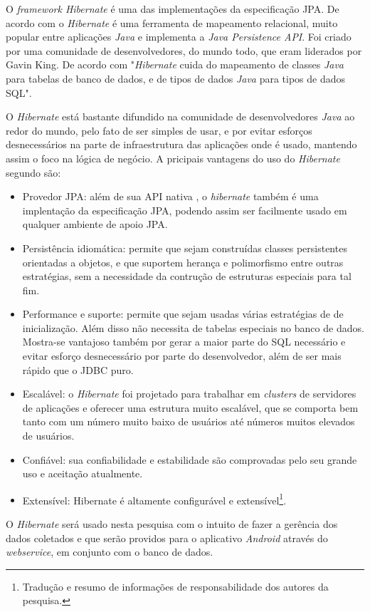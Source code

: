 	\par O \textit{framework Hibernate} é uma das implementações da especificação
JPA. De acordo com  o \textit{Hibernate} é
uma ferramenta de mapeamento relacional, muito popular entre aplicações
\textit{Java} e implementa a \textit{Java Persistence API}. Foi criado por uma
comunidade de desenvolvedores, do mundo todo, que eram liderados por Gavin King.
De acordo com  "\textit{Hibernate} cuida do mapeamento
de classes \textit{Java} para tabelas de banco de dados, e de tipos de dados
\textit{Java} para tipos de dados SQL".

	\par O \textit{Hibernate} está bastante difundido na comunidade de
desenvolvedores \textit{Java} ao redor do mundo, pelo fato de ser simples de
usar, e por evitar esforços desnecessários na parte de infraestrutura das
aplicações onde é usado, mantendo assim o foco na lógica de negócio. A pricipais
vantagens do uso do \textit{Hibernate} segundo
 são:

	\begin{itemize}
	  
	  		\item Provedor JPA: além de sua API nativa , o \textit{hibernate}
	  	também é uma implentação da especificação JPA, podendo assim ser facilmente
	  	usado em qualquer ambiente de apoio JPA.
	  		
	  		\item Persistência idiomática: permite que sejam construídas classes
	  	persistentes orientadas a objetos, e que suportem herança e polimorfismo
	  	entre outras estratégias, sem a necessidade da contrução de estruturas
	  	especiais para tal fim.
	  	
	  		\item Performance e suporte: permite que sejam usadas várias estratégias de
	  	 de inicialização. Além disso não necessita de tabelas especiais no banco de
	  	 dados. Mostra-se vantajoso também por gerar a maior parte do SQL
	  	 necessário e evitar esforço desnecessário por parte do desenvolvedor, além
	  	 de ser mais rápido que o JDBC puro.
	  
	  		\item Escalável: o \textit{Hibernate} foi projetado para trabalhar em
	  	\textit{clusters} de servidores de aplicações e oferecer uma estrutura
	  	muito escalável, que se comporta bem tanto com um número muito baixo de
	  	usuários até números muitos elevados de usuários.

			\item Confiável: sua confiabilidade e estabilidade são comprovadas pelo
		seu grande uso e aceitação atualmente.
			
			\item Extensível: Hibernate é altamente configurável e
		extensível\footnote{Tradução e resumo de informações de responsabilidade dos
		autores da pesquisa.}.
	
	\end{itemize}
	
	\par O \textit{Hibernate} será usado nesta pesquisa com o intuito de fazer a
gerência dos dados coletados e que serão providos para o aplicativo
\textit{Android} através do \textit{webservice}, em conjunto com o banco de
dados.